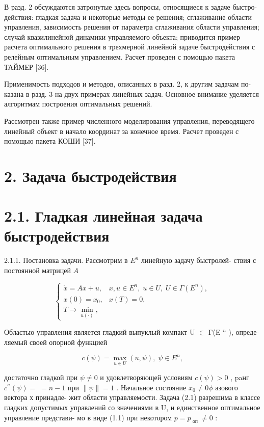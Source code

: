 \documentclass[10pt]{article}
\begin{document}
В разд. 2 обсуждаются затронутые здесь вопросы, относящиеся к задаче быстро- действия: гладкая задача и некоторые методы ее решения; сглаживание области управления, зависимость решения от параметра сглаживания области управления; случай квазилинейной динамики управляемого объекта; приводится пример расчета оптимального решения в трехмерной линейной задаче быстродействия с релейным оптимальным управлением. Расчет проведен с помощью пакета ТАЙМЕР [36].

Применимость подходов и методов, описанных в разд. 2, к другим задачам по- казана в разд. 3 на двух примерах линейных задач. Основное внимание уделяется алгоритмам построения оптимальных решений.

Рассмотрен также пример численного моделирования управления, переводящего линейный объект в начало координат за конечное время. Расчет проведен с помощью пакета КОШИ [37].

\section*{2. Задача быстродействия}

\section*{2.1. Гладкая линейная задача быстродействия}

2.1.1. Постановка задачи. Рассмотрим в \({E}^{n}\) линейную задачу быстролей- ствия с постоянной матрицей \(A\)

\[
\left\{  \begin{array}{ll} \dot{x} = {Ax} + u, & x,u \in  {E}^{n},\;u \in  U,\;U \in  \Gamma \left( {E}^{n}\right) , \\  x\left( 0\right)  = {x}_{0}, & x\left( T\right)  = 0, \\  T \rightarrow  \mathop{\min }\limits_{{u\left( \cdot \right) }}, &  \end{array}\right. \tag{2.1}
\]

Областью управления является гладкий выпуклый компакт U \(\in\) Γ(E \({}^{n}\) ), опреде- ляемый своей опорной функцией

\[
c\left( \psi \right)  = \mathop{\max }\limits_{{u \in  U}}\left( {u,\psi }\right) ,\;\psi  \in  {E}^{n},
\]

достаточно гладкой при \(\psi  \neq  0\) и удовлетворяющей условиям \(c\left( \psi \right)  > 0\) , paнг \({c}^{\prime \prime }\left( \psi \right)  = \; = n - 1\) при \(\parallel \psi \parallel  = 1\) . Начальное состояние \({x}_{0} \neq  0\phi\) азового вектора х принадле- жит области управляемости. Задача (2.1) разрешима в классе гладких допустимых управлений со значениями в U, и единственное оптимальное управление представи- мо в виде (1.1) при некотором \(p = {p}_{\text{ оп }} \neq  0\) :
\end{document}
